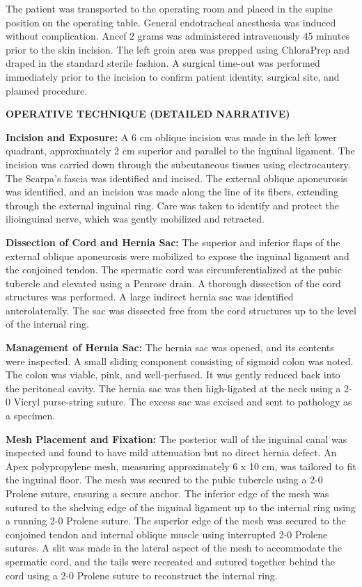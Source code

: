 \documentclass[10pt]{article}
\newcommand{\opsection}[1]{%
  \vspace{1.2em}%
  \begin{tcolorbox}[
    colback=secondarycolor,
    colframe=secondarycolor,
    arc=1mm,
    left=8pt, right=8pt, top=4pt, bottom=4pt,
    boxrule=0pt,
    grow to left by=0pt,
    grow to right by=0pt
  ]
    \color{white}\bfseries\sffamily\fontsize{10}{12}\selectfont #1
  \end{tcolorbox}%
  \vspace{0.4em}%
}
\newcommand{\reporttext}[1]{{\fontsize{9.5}{13.5}\selectfont\sffamily\color{darktext} #1\par}}
\begin{document}
\reporttext{The patient was transported to the operating room and placed in the supine position on the operating table. General endotracheal anesthesia was induced without complication. Ancef 2 grams was administered intravenously 45 minutes prior to the skin incision. The left groin area was prepped using ChloraPrep and draped in the standard sterile fashion. A surgical time-out was performed immediately prior to the incision to confirm patient identity, surgical site, and planned procedure.}

\opsection{OPERATIVE TECHNIQUE (DETAILED NARRATIVE)}
\reporttext{\textbf{Incision and Exposure:} A 6 cm oblique incision was made in the left lower quadrant, approximately 2 cm superior and parallel to the inguinal ligament. The incision was carried down through the subcutaneous tissues using electrocautery. The Scarpa's fascia was identified and incised. The external oblique aponeurosis was identified, and an incision was made along the line of its fibers, extending through the external inguinal ring. Care was taken to identify and protect the ilioinguinal nerve, which was gently mobilized and retracted.}

\reporttext{\textbf{Dissection of Cord and Hernia Sac:} The superior and inferior flaps of the external oblique aponeurosis were mobilized to expose the inguinal ligament and the conjoined tendon. The spermatic cord was circumferentialized at the pubic tubercle and elevated using a Penrose drain. A thorough dissection of the cord structures was performed. A large indirect hernia sac was identified anterolaterally. The sac was dissected free from the cord structures up to the level of the internal ring.}

\reporttext{\textbf{Management of Hernia Sac:} The hernia sac was opened, and its contents were inspected. A small sliding component consisting of sigmoid colon was noted. The colon was viable, pink, and well-perfused. It was gently reduced back into the peritoneal cavity. The hernia sac was then high-ligated at the neck using a 2-0 Vicryl purse-string suture. The excess sac was excised and sent to pathology as a specimen.}

\reporttext{\textbf{Mesh Placement and Fixation:} The posterior wall of the inguinal canal was inspected and found to have mild attenuation but no direct hernia defect. An Apex polypropylene mesh, measuring approximately 6 x 10 cm, was tailored to fit the inguinal floor. The mesh was secured to the pubic tubercle using a 2-0 Prolene suture, ensuring a secure anchor. The inferior edge of the mesh was sutured to the shelving edge of the inguinal ligament up to the internal ring using a running 2-0 Prolene suture. The superior edge of the mesh was secured to the conjoined tendon and internal oblique muscle using interrupted 2-0 Prolene sutures. A slit was made in the lateral aspect of the mesh to accommodate the spermatic cord, and the tails were recreated and sutured together behind the cord using a 2-0 Prolene suture to reconstruct the internal ring.}
\end{document}
